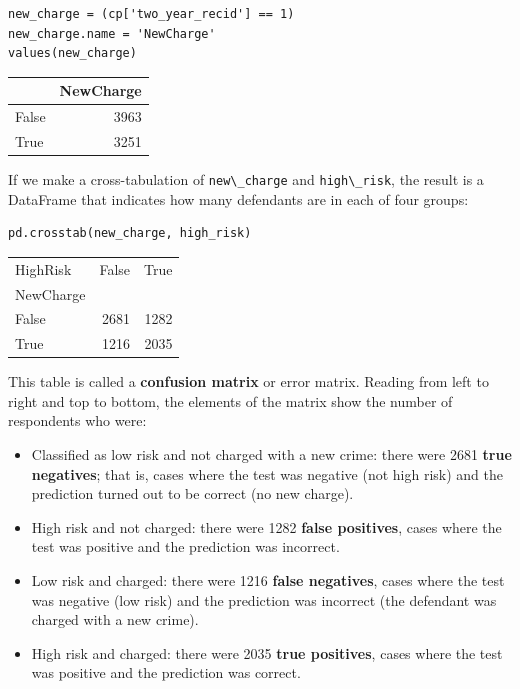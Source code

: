 \begin{lstlisting}[]
new_charge = (cp['two_year_recid'] == 1)
new_charge.name = 'NewCharge'
values(new_charge)
\end{lstlisting}

\begin{tabular}{lr}
\midrule
{} &  NewCharge \\
\midrule
False &       3963 \\
True  &       3251 \\
\midrule
\end{tabular}

If we make a cross-tabulation of \passthrough{\lstinline!new\_charge!}
and \passthrough{\lstinline!high\_risk!}, the result is a DataFrame that
indicates how many defendants are in each of four groups:

\begin{lstlisting}[]
pd.crosstab(new_charge, high_risk)
\end{lstlisting}

\begin{tabular}{lrr}
\midrule
HighRisk &  False &  True  \\
NewCharge &        &        \\
\midrule
False     &   2681 &   1282 \\
True      &   1216 &   2035 \\
\midrule
\end{tabular}

This table is called a \textbf{confusion matrix} or error matrix.
Reading from left to right and top to bottom, the elements of the matrix
show the number of respondents who were:

\begin{itemize}
\item
  Classified as low risk and not charged with a new crime: there were
  2681 \textbf{true negatives}; that is, cases where the test was
  negative (not high risk) and the prediction turned out to be correct
  (no new charge).
\item
  High risk and not charged: there were 1282 \textbf{false positives},
  cases where the test was positive and the prediction was incorrect.
\item
  Low risk and charged: there were 1216 \textbf{false negatives}, cases
  where the test was negative (low risk) and the prediction was
  incorrect (the defendant was charged with a new crime).
\item
  High risk and charged: there were 2035 \textbf{true positives}, cases
  where the test was positive and the prediction was correct.
\end{itemize}

